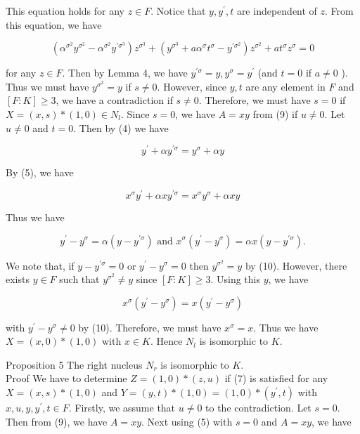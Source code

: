 \documentclass[10pt]{article}
\begin{document}
This equation holds for any $z \in F$. Notice that $y, y^{\prime}, t$ are independent of $z$. From this equation, we have

$$
\left(\alpha^{\sigma^{2}} y^{\sigma^{2}}-\alpha^{\sigma^{2}} y^{\prime \sigma^{3}}\right) z^{\sigma^{3}}+\left(y^{\sigma^{3}}+a \alpha^{\sigma} t^{\sigma}-y^{\prime \sigma^{2}}\right) z^{\sigma^{2}}+a t^{\sigma} z^{\sigma}=0
$$

for any $z \in F$. Then by Lemma 4, we have $y^{\prime \sigma}=y, y^{\sigma}=y^{\prime}$ (and $t=0$ if $a \neq 0$ ). Thus we must have $y^{\sigma^{2}}=y$ if $s \neq 0$. However, since $y, t$ are any element in $F$ and $[F: K] \geq 3$, we have a contradiction if $s \neq 0$. Therefore, we must have $s=0$ if $X=(x, s) *(1,0) \in N_{l}$. Since $s=0$, we have $A=x y$ from (9) if $u \neq 0$. Let $u \neq 0$ and $t=0$. Then by (4) we have

$$
y^{\prime}+\alpha y^{\prime \sigma}=y^{\sigma}+\alpha y
$$

By (5), we have

$$
x^{\sigma} y^{\prime}+\alpha x y^{\prime \sigma}=x^{\sigma} y^{\sigma}+\alpha x y
$$

Thus we have


\begin{equation*}
y^{\prime}-y^{\sigma}=\alpha\left(y-y^{\prime \sigma}\right) \text { and } x^{\sigma}\left(y^{\prime}-y^{\sigma}\right)=\alpha x\left(y-y^{\prime \sigma}\right) . \tag{10}
\end{equation*}


We note that, if $y-y^{\prime \sigma}=0$ or $y^{\prime}-y^{\sigma}=0$ then $y^{\sigma^{2}}=y$ by (10). However, there exists $y \in F$ such that $y^{\sigma^{2}} \neq y$ since $[F: K] \geq 3$. Using this $y$, we have

$$
x^{\sigma}\left(y^{\prime}-y^{\sigma}\right)=x\left(y^{\prime}-y^{\sigma}\right)
$$

with $y^{\prime}-y^{\sigma} \neq 0$ by (10). Therefore, we must have $x^{\sigma}=x$. Thus we have $X=(x, 0) *(1,0)$ with $x \in K$. Hence $N_{l}$ is isomorphic to $K$.

Proposition 5 The right nucleus $N_{r}$ is isomorphic to $K$.\\
Proof We have to determine $Z=(1,0) *(z, u)$ if (7) is satisfied for any $X=(x, s) *(1,0)$ and $Y=(y, t) *(1,0)=(1,0) *\left(y^{\prime}, t\right)$ with $x, u, y, y^{\prime}, t \in F$. Firstly, we assume that $u \neq 0$ to the contradiction. Let $s=0$. Then from (9), we have $A=x y$. Next using (5) with $s=0$ and $A=x y$, we have
\end{document}
